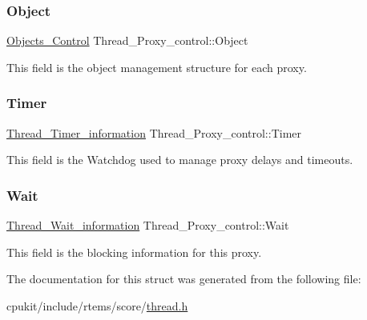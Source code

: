 \subsubsection{\texorpdfstring{Object}{Object}}
{\footnotesize\ttfamily \mbox{\hyperlink{structObjects__Control}{Objects\+\_\+\+Control}} Thread\+\_\+\+Proxy\+\_\+control\+::\+Object}

This field is the object management structure for each proxy. \mbox{\label{structThread__Proxy__control_a36f44d282e1581fce2c3699f07ed7eb0}} 
\subsubsection{\texorpdfstring{Timer}{Timer}}
{\footnotesize\ttfamily \mbox{\hyperlink{structThread__Timer__information}{Thread\+\_\+\+Timer\+\_\+information}} Thread\+\_\+\+Proxy\+\_\+control\+::\+Timer}

This field is the Watchdog used to manage proxy delays and timeouts. \mbox{\label{structThread__Proxy__control_a7363a6f364d9a36986ddaf7bdc193a93}} 
\subsubsection{\texorpdfstring{Wait}{Wait}}
{\footnotesize\ttfamily \mbox{\hyperlink{structThread__Wait__information}{Thread\+\_\+\+Wait\+\_\+information}} Thread\+\_\+\+Proxy\+\_\+control\+::\+Wait}

This field is the blocking information for this proxy. 

The documentation for this struct was generated from the following file\+:\begin{DoxyCompactItemize}
\item 
cpukit/include/rtems/score/\mbox{\hyperlink{score_2thread_8h}{thread.\+h}}\end{DoxyCompactItemize}
